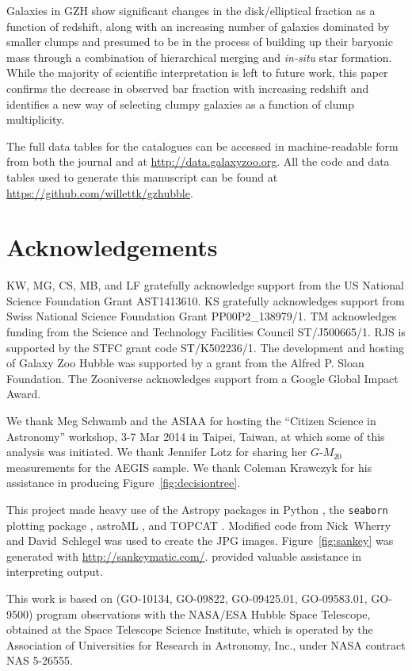 \documentclass[a4paper,fleqn,usenatbib]{mnras}
\begin{document}
Galaxies in GZH show significant changes in the disk/elliptical fraction as a
function of redshift, along with an increasing number of galaxies dominated by
smaller clumps and presumed to be in the process of building up their baryonic
mass through a combination of hierarchical merging and {\it in-situ} star formation.
While the majority of scientific interpretation is left to future work, this
paper confirms the decrease in observed bar fraction with increasing redshift
and identifies a new way of selecting clumpy galaxies as a
function of clump multiplicity.

The full data tables for the catalogues can be accessed in machine-readable form
from both the journal and at \url{http://data.galaxyzoo.org}. All the code and
data tables used to generate this manuscript can be found at
\url{https://github.com/willettk/gzhubble}.
 
\section*{Acknowledgements}
KW, MG, CS, MB, and LF gratefully acknowledge support from the US National
Science Foundation Grant AST1413610. KS gratefully acknowledges support from
Swiss National Science Foundation Grant PP00P2\_138979/1. TM acknowledges
funding from the Science and Technology Facilities Council ST/J500665/1. 
RJS is supported by the STFC grant code ST/K502236/1.
The development and hosting of Galaxy Zoo Hubble was supported by a grant from
the Alfred P. Sloan Foundation. The Zooniverse acknowledges support from a
Google Global Impact Award. 

We thank Meg Schwamb and the ASIAA for hosting the ``Citizen Science in
Astronomy'' workshop, 3-7 Mar 2014 in Taipei, Taiwan, at which some of this
analysis was initiated. We thank Jennifer Lotz for sharing her $G$-$M_{20}$
measurements for the AEGIS sample. We thank Coleman Krawczyk for his assistance
in producing Figure~\ref{fig:decisiontree}.

This project made heavy use of the Astropy packages in Python \citep{ast13},
the \texttt{seaborn} plotting package \citep{was15}, astroML \citep{van12}, and
TOPCAT \citep{tay05,tay11}. Modified code from Nick~Wherry and David~Schlegel
was used to create the JPG images. Figure~\ref{fig:sankey} was generated with
\url{http://sankeymatic.com/}. \citet{hol05} provided valuable assistance
in interpreting \sextractor{} output.

This work is based on (GO-10134, GO-09822, GO-09425.01, GO-09583.01, GO-9500)
program observations with the NASA/ESA Hubble Space Telescope, obtained at the
Space Telescope Science Institute, which is operated by the Association of
Universities for Research in Astronomy, Inc., under NASA contract NAS 5-26555. 
\end{document}

